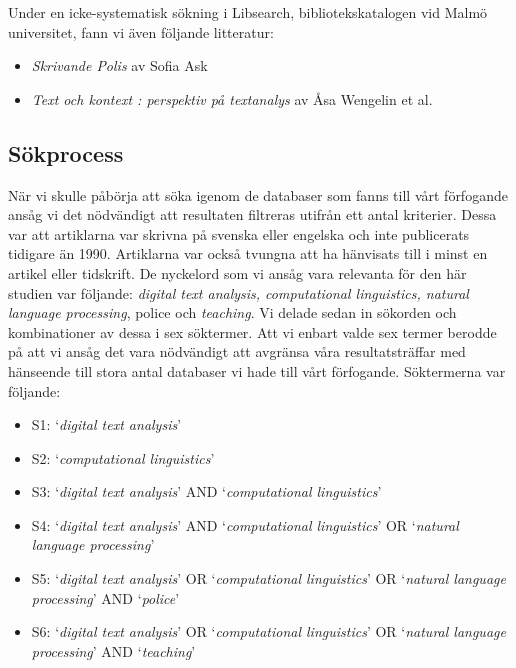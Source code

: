 \documentclass[swedish]{maucsthesis}
\begin{document}
Under en icke-systematisk sökning i Libsearch, bibliotekskatalogen vid Malmö
universitet, fann vi även följande litteratur:

\begin{itemize}
\item \textit{Skrivande Polis} av Sofia Ask
\item \textit{Text och kontext : perspektiv på textanalys} av Åsa Wengelin et al.
\end{itemize}

\subsection{Sökprocess}

När vi skulle påbörja att söka igenom de databaser som fanns till vårt förfogande ansåg vi
det nödvändigt att resultaten filtreras utifrån ett antal kriterier. Dessa var
att artiklarna var skrivna på svenska eller engelska och inte publicerats
tidigare än 1990. Artiklarna var också tvungna att ha hänvisats till i minst en
artikel eller tidskrift. De nyckelord som vi ansåg vara relevanta för den här
studien var följande: \textit {digital text analysis, computational linguistics, natural
language processing}, {police} och \textit {teaching}. Vi delade sedan in sökorden och kombinationer av
dessa i sex söktermer. Att vi enbart valde sex termer berodde på att vi ansåg det vara nödvändigt att avgränsa våra resultatsträffar med hänseende till stora antal
databaser vi hade till vårt förfogande.  Söktermerna var följande:

\begin{itemize}
\item S1: ‘\textit{digital text analysis}’
\item S2: ‘\textit{computational linguistics}’
\item S3: ‘\textit{digital text analysis}’ AND ‘\textit{computational
    linguistics}’
\item S4: ‘\textit{digital text analysis}’ AND ‘\textit{computational
    linguistics}’ OR ‘\textit{natural language processing}’
\item S5: ‘\textit{digital text analysis}’ OR
  ‘\textit{computational linguistics}’ OR ‘\textit{natural language processing}’ AND ‘\textit{police}’ 
\item S6: ‘\textit{digital text analysis}’ OR
  ‘\textit{computational linguistics}’ OR ‘\textit{natural language processing}’ AND ‘\textit{teaching}’ 
\end{itemize}
\end{document}
